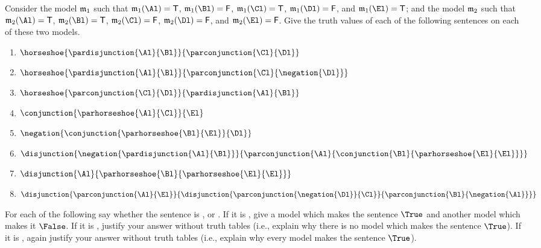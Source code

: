 Consider the model $\mathfrak{m}_1$ such that $\IntA_1(\Al)=\TrueB$, $\IntA_1(\Bl)=\FalseB$, $\IntA_1(\Cl)=\TrueB$, $\IntA_1(\Dl)=\FalseB$, and $\IntA_1(\El)=\TrueB$; and the model $\mathfrak{m}_2$ such that $\IntA_2(\Al)=\TrueB$, $\IntA_2(\Bl)=\TrueB$, $\IntA_2(\Cl)=\FalseB$, $\IntA_2(\Dl)=\FalseB$, and $\IntA_2(\El)=\FalseB$.
Give the truth values of each of the following \GSL{} sentences on each of these two models.
\begin{multicols}{2}
\begin{enumerate}
\item $\horseshoe{\pardisjunction{\Al}{\Bl}}{\parconjunction{\Cl}{\Dl}}$
\item $\horseshoe{\pardisjunction{\Al}{\Bl}}{\parconjunction{\Cl}{\negation{\Dl}}}$
\item $\horseshoe{\parconjunction{\Cl}{\Dl}}{\pardisjunction{\Al}{\Bl}}$
\item $\conjunction{\parhorseshoe{\Al}{\Cl}}{\El}$
\item $\negation{\conjunction{\parhorseshoe{\Bl}{\El}}{\Dl}}$
\item $\disjunction{\negation{\pardisjunction{\Al}{\Bl}}}{\parconjunction{\Al}{\conjunction{\Bl}{\parhorseshoe{\El}{\El}}}}$
\item $\disjunction{\Al}{\parhorseshoe{\Bl}{\parhorseshoe{\El}{\El}}}$
\item $\disjunction{\parconjunction{\Al}{\El}}{\disjunction{\parconjunction{\negation{\Dl}}{\Cl}}{\parconjunction{\Bl}{\negation{\Al}}}}$
\end{enumerate}
\end{multicols}

For each of the following say whether the sentence is ,  or . 
If it is , give a model which makes the sentence $\True$ and another model which makes it $\False$. 
If it is , justify your answer without truth tables (i.e., explain why there is no model which makes the sentence $\True$). 
If it is , again justify your answer without truth tables (i.e., explain why every model makes the sentence $\True$).

